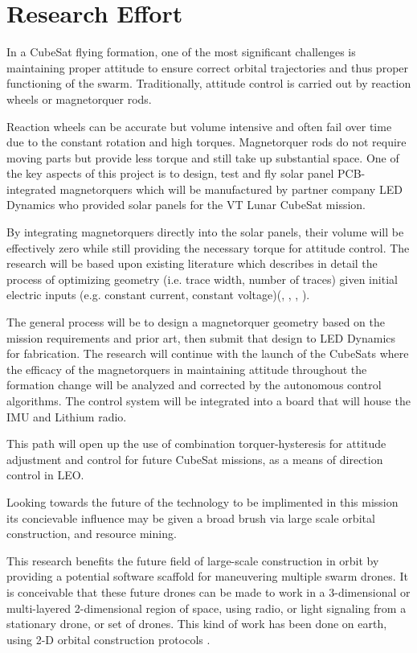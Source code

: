 \section{Research Effort}

In a CubeSat flying formation, one of the most significant challenges
is maintaining proper attitude to ensure correct orbital trajectories
and thus proper functioning of the swarm. Traditionally, attitude
control is carried out by reaction wheels or magnetorquer
rods.

Reaction wheels can be accurate but volume intensive and often
fail over time due to the constant rotation and high
torques. Magnetorquer rods do not require moving parts but provide
less torque and still take up substantial space. One of the key
aspects of this project is to design, test and fly solar panel
PCB-integrated magnetorquers which will be manufactured by partner
company LED Dynamics who provided solar panels for the VT Lunar
CubeSat mission.

By integrating magnetorquers directly into the solar panels, their
volume will be effectively zero while still providing the necessary
torque for attitude control. The research will be based upon existing
literature which describes in detail the process of optimizing
geometry (i.e. trace width, number of traces) given initial electric
inputs (e.g. constant current, constant voltage)(\cite{ali:2021},
\cite{khan:2022}, \cite{sokal:2019}, \cite{sorensen:2021}).

 The general process will be to design a magnetorquer geometry based
 on the mission requirements and prior art, then submit that design to
 LED Dynamics for fabrication. The research will continue with the
 launch of the CubeSats where the efficacy of the magnetorquers in
 maintaining attitude throughout the formation change will be analyzed
 and corrected by the autonomous control algorithms. The control
 system will be integrated into a board that will house the IMU and
 Lithium radio.

This path will open up the use of combination torquer-hysteresis for
attitude adjustment and control for future CubeSat missions, as a
means of direction control in LEO.

Looking towards the future of the technology to be implimented in this
mission its concievable influence may be given a broad brush via large
scale orbital construction, and resource mining.

This research benefits the future field of large-scale construction in
orbit by providing a potential software scaffold for maneuvering
multiple swarm drones. It is conceivable that these future drones can
be made to work in a 3-dimensional or multi-layered 2-dimensional
region of space, using radio, or light signaling from a stationary
drone, or set of drones. This kind of work has been done on earth,
using 2-D orbital construction protocols \cite{Vardy:2018}.

